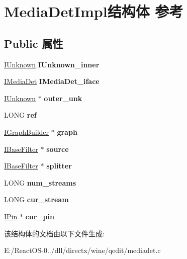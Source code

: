 \hypertarget{struct_media_det_impl}{}\section{Media\+Det\+Impl结构体 参考}
\label{struct_media_det_impl}
\subsection*{Public 属性}
\begin{DoxyCompactItemize}
\item 
\mbox{\label{struct_media_det_impl_ad05279ea9dd0ef6d15514897fb088a0e}} 
\hyperlink{interface_i_unknown}{I\+Unknown} {\bfseries I\+Unknown\+\_\+inner}
\item 
\mbox{\label{struct_media_det_impl_a0e8ffa13dc3e8253f453969f7e7d11be}} 
\hyperlink{interface_i_media_det}{I\+Media\+Det} {\bfseries I\+Media\+Det\+\_\+iface}
\item 
\mbox{\label{struct_media_det_impl_adfb4374b6f9fb1d1d65796993be01b3d}} 
\hyperlink{interface_i_unknown}{I\+Unknown} $\ast$ {\bfseries outer\+\_\+unk}
\item 
\mbox{\label{struct_media_det_impl_a8b4558309325e23cf98e248cddfdfd6a}} 
L\+O\+NG {\bfseries ref}
\item 
\mbox{\label{struct_media_det_impl_a962da8a6cfe37716a983269f279be3fd}} 
\hyperlink{interface_i_graph_builder}{I\+Graph\+Builder} $\ast$ {\bfseries graph}
\item 
\mbox{\label{struct_media_det_impl_a25649846d6093fffcf55aab746806d06}} 
\hyperlink{interface_i_base_filter}{I\+Base\+Filter} $\ast$ {\bfseries source}
\item 
\mbox{\label{struct_media_det_impl_a55b7be496523001766b9cf0591d45da7}} 
\hyperlink{interface_i_base_filter}{I\+Base\+Filter} $\ast$ {\bfseries splitter}
\item 
\mbox{\label{struct_media_det_impl_afb6b013148cacccbad6c3792353d6ddc}} 
L\+O\+NG {\bfseries num\+\_\+streams}
\item 
\mbox{\label{struct_media_det_impl_a489e00be9d46616ab26cfc17d00edbc2}} 
L\+O\+NG {\bfseries cur\+\_\+stream}
\item 
\mbox{\label{struct_media_det_impl_abb8b2e21e2d51647aa3c13d13214c6d0}} 
\hyperlink{interface_i_pin}{I\+Pin} $\ast$ {\bfseries cur\+\_\+pin}
\end{DoxyCompactItemize}


该结构体的文档由以下文件生成\+:\begin{DoxyCompactItemize}
\item 
E\+:/\+React\+O\+S-\/0../dll/directx/wine/qedit/mediadet.\+c\end{DoxyCompactItemize}
